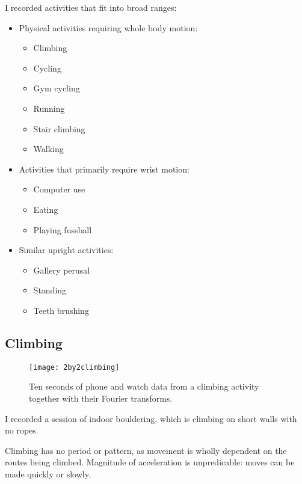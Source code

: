     I recorded activities that fit into broad ranges:
    \begin{itemize}
      \item Physical activities requiring whole body motion:
      \begin{itemize}
        \item Climbing
        \item Cycling
        \item Gym cycling
        \item Running
        \item Stair climbing
        \item Walking
      \end{itemize} 
      \item Activities that primarily require wrist motion:
      \begin{itemize}
        \item Computer use
        \item Eating
        \item Playing fussball
      \end{itemize}
      \item Similar upright activities:
      \begin{itemize}
        \item Gallery perusal
        \item Standing
        \item Teeth brushing
      \end{itemize}
    \end{itemize}
    \pagebreak[4]
    \subsection{Climbing}
      \begin{figure}[!th]
        \centering
        \texttt{[image: 2by2climbing]}
        \caption{Ten seconds of phone and watch data from a climbing activity together with their Fourier transforms.}
        \label{fig:2by2climbing }
      \end{figure}
      
      I recorded a session of indoor bouldering, which is climbing on short walls with no ropes.
      
      Climbing has no period or pattern, as movement is wholly dependent on the routes being climbed. Magnitude of acceleration is unpredicable: moves can be made quickly or slowly.
      
      
    \pagebreak[4]
